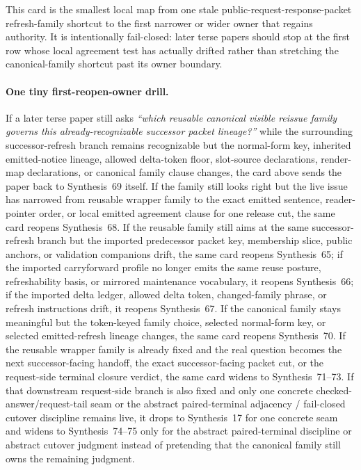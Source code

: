 \documentclass[11pt]{article}
\begin{document}
This card is the smallest local map from one stale public-request-response-packet refresh-family shortcut to the first narrower or wider owner that regains authority. It is intentionally fail-closed: later terse papers should stop at the first row whose local agreement test has actually drifted rather than stretching the canonical-family shortcut past its owner boundary.

\paragraph{One tiny first-reopen-owner drill.}
If a later terse paper still asks \emph{``which reusable canonical visible reissue family governs this already-recognizable successor packet lineage?''} while the surrounding successor-refresh branch remains recognizable but the normal-form key, inherited emitted-notice lineage, allowed delta-token floor, slot-source declarations, render-map declarations, or canonical family clause changes, the card above sends the paper back to Synthesis~69 itself. If the family still looks right but the live issue has narrowed from reusable wrapper family to the exact emitted sentence, reader-pointer order, or local emitted agreement clause for one release cut, the same card reopens Synthesis~68. If the reusable family still aims at the same successor-refresh branch but the imported predecessor packet key, membership slice, public anchors, or validation companions drift, the same card reopens Synthesis~65; if the imported carryforward profile no longer emits the same reuse posture, refreshability basis, or mirrored maintenance vocabulary, it reopens Synthesis~66; if the imported delta ledger, allowed delta token, changed-family phrase, or refresh instructions drift, it reopens Synthesis~67. If the canonical family stays meaningful but the token-keyed family choice, selected normal-form key, or selected emitted-refresh lineage changes, the same card reopens Synthesis~70. If the reusable wrapper family is already fixed and the real question becomes the next successor-facing handoff, the exact successor-facing packet cut, or the request-side terminal closure verdict, the same card widens to Synthesis~71--73. If that downstream request-side branch is also fixed and only one concrete checked-answer/request-tail seam or the abstract paired-terminal adjacency / fail-closed cutover discipline remains live, it drops to Synthesis~17 for one concrete seam and widens to Synthesis~74--75 only for the abstract paired-terminal discipline or abstract cutover judgment instead of pretending that the canonical family still owns the remaining judgment.\cite{series:publicrequestresponsepackets,series:publicrequestresponsepacketcarryforward,series:publicrequestresponsepacketdeltas,series:publicrequestresponsepacketrefreshnotices,series:publicrequestresponsepacketrefreshnoticeselections,series:publicrequestresponsepacketrefreshresponsemenus,series:publicrequestresponsepacketrefreshresponsepackets,series:publicrequestresponsepacketrefreshresponsepacketclosureverdicts,series:pairedterminalcitationdiscipline,series:pairedterminalcutoverrule}
\end{document}
